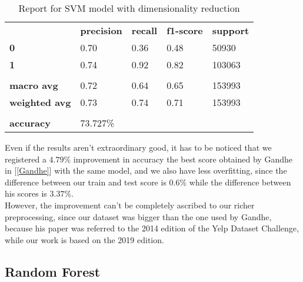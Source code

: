 \begin{table}[h]
    \centering
    \begin{tabular}{lllll}
        \rowcolor[HTML]{EEEEEE} 
        \cellcolor[HTML]{FBFBFB} & \textbf{precision} & \textbf{recall} & \textbf{f1-score} & \textbf{support} \\
        \rowcolor[HTML]{EEEEEE} 
        \textbf{0}               & 0.70               & 0.36            & 0.48              & 50930            \\
        \rowcolor[HTML]{EEEEEE} 
        \textbf{1}               & 0.74               & 0.92            & 0.82              & 103063           \\
        \rowcolor[HTML]{FBFBFB} 
        &                    &                 &                   &                  \\
        \rowcolor[HTML]{EEEEEE} 
        \textbf{macro avg}       & 0.72               & 0.64            & 0.65              & 153993           \\
        \rowcolor[HTML]{EEEEEE} 
        \textbf{weighted avg}    & 0.73               & 0.74            & 0.71              & 153993           \\
        \rowcolor[HTML]{FBFBFB} 
        &                    &                 &                   &                  \\
        \rowcolor[HTML]{EEEEEE} 
        \textbf{accuracy}        & \multicolumn{4}{l}{\cellcolor[HTML]{EEEEEE}73.727\%}                         
    \end{tabular}
    \caption{Report for SVM model with dimensionality reduction}
    \label{tab:svm-res-1}
\end{table}

Even if the results aren't extraordinary good, it has to be noticed that we registered a $4.79‬\%$ improvement in accuracy \wrt the best score obtained by Gandhe in [\ref{Gandhe}] with the same model, and we also have less overfitting, since the difference between our train and test score is $0.6\%$ while the difference between his scores is $3.37\%$.\\
However, the improvement can't be completely ascribed to our richer preprocessing, since our dataset was bigger than the one used by Gandhe, because his paper was referred to the 2014 edition of the Yelp Dataset Challenge, while our work is based on the 2019 edition.


\newpage
\subsection{Random Forest}\label{sec:rf}

